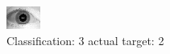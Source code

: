 \begin{figure}[h!]
\begin{center}
\includegraphics[width=0.60\columnwidth]{figures/ID1656_class_3_target_2.png}
\end{center}
\caption{ Classification: 3 actual target: 2}
\label{fig:ID1656_class_3_target_2}
\end{figure}
